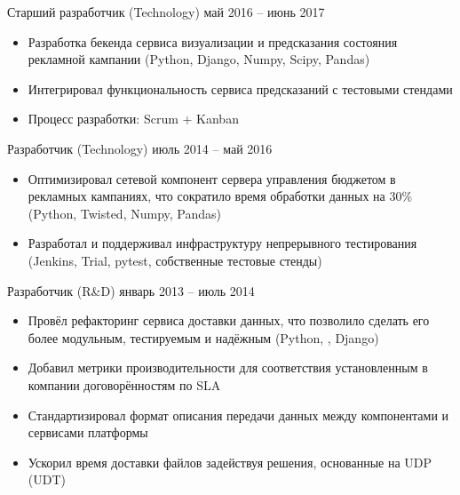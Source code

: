 \documentclass[unicode, 10pt, a4paper, oneside, fleqn]{article}
\begin{document}
{{\begin{itemize}
                \end{itemize}
            }
        \position  %
            {Старший разработчик (Technology)}
            {май 2016 -- июнь 2017}
            {
                \begin{itemize}
                    \item{Разработка бекенда сервиса визуализации и предсказания
                          состояния рекламной кампании (Python, Django, Numpy,
                          Scipy, Pandas)}
                    \item{Интегрировал функциональность сервиса предсказаний с
                          тестовыми стендами}
                    \item{Процесс разработки: Scrum + Kanban}
                \end{itemize}
            }
        \position  %
            {Разработчик (Technology)}
            {июль 2014 -- май 2016}
            {
                \begin{itemize}
                    \item{Оптимизировал сетевой компонент сервера управления
                          бюджетом в рекламных кампаниях, что сократило время
                          обработки данных на 30\% (Python, Twisted, Numpy, Pandas)}
                    \item{Разработал и поддерживал инфраструктуру непрерывного
                          тестирования (Jenkins, Trial, pytest, собственные тестовые стенды)}
                \end{itemize}
            }
        \position  %
            {Разработчик (R\&D)}
            {январь 2013 -- июль 2014}
            {
                \begin{itemize}
                    \item{Провёл рефакторинг сервиса доставки данных, что
                          позволило сделать его более модульным, тестируемым и
                          надёжным (Python, , Django)}
                    \item{Добавил метрики производительности для соответствия
                          установленным в компании договорённостям по SLA}
                    \item{Стандартизировал формат описания передачи данных
                          между компонентами и сервисами платформы}
                    \item{Ускорил время доставки файлов задействуя решения,
                          основанные на UDP (UDT)}
                \end{itemize}
            }
    }
\end{document}
